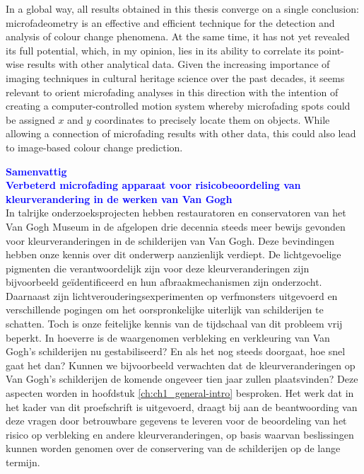 In a global way, all results obtained in this thesis converge on a single conclusion: microfadeometry is an effective and efficient technique for the detection and analysis of colour change phenomena. At the same time, it has not yet revealed its full potential, which, in my opinion, lies in its ability to correlate its point-wise results with other analytical data. Given the increasing importance of imaging techniques in cultural heritage science over the past decades, it seems relevant to orient microfading analyses in this direction with the intention of creating a computer-controlled motion system whereby microfading spots could be assigned $x$ and $y$ coordinates to precisely locate them on objects. While allowing a connection of microfading results with other data, this could also lead to image-based colour change prediction.

\newpage
\textbf{\textcolor{blue}{\LARGE Samenvattig}}\\

\textbf{\textcolor{blue}{Verbeterd microfading apparaat voor risicobeoordeling van kleurverandering in de werken van Van Gogh}}\\


In talrijke onderzoeksprojecten hebben restauratoren en conservatoren van het Van Gogh Museum in de afgelopen drie decennia steeds meer bewijs gevonden voor kleurveranderingen in de schilderijen van Van Gogh. Deze bevindingen hebben onze kennis over dit onderwerp aanzienlijk verdiept. De lichtgevoelige pigmenten die verantwoordelijk zijn voor deze kleurveranderingen zijn bijvoorbeeld geïdentificeerd en hun afbraakmechanismen zijn onderzocht. Daarnaast zijn lichtverouderingsexperimenten op verfmonsters uitgevoerd en verschillende pogingen om het oorspronkelijke uiterlijk van schilderijen te schatten. Toch is onze feitelijke kennis van de tijdschaal van dit probleem vrij beperkt. In hoeverre is de waargenomen verbleking en verkleuring van Van Gogh's schilderijen nu gestabiliseerd? En als het nog steeds doorgaat, hoe snel gaat het dan? Kunnen we bijvoorbeeld verwachten dat de kleurveranderingen op Van Gogh's schilderijen de komende ongeveer tien jaar zullen plaatsvinden? Deze aspecten worden in hoofdstuk \ref{ch:ch1_general-intro} besproken. Het werk dat in het kader van dit proefschrift is uitgevoerd, draagt bij aan de beantwoording van deze vragen door betrouwbare gegevens te leveren voor de beoordeling van het risico op verbleking en andere kleurveranderingen, op basis waarvan beslissingen kunnen worden genomen over de conservering van de schilderijen op de lange termijn.



